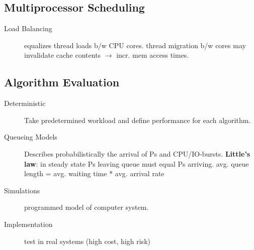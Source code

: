 \subsection*{Multiprocessor Scheduling} %
\begin{description}
    \item[Load Balancing]equalizes thread loads b/w CPU cores. thread migration b/w cores may invalidate cache contents $\rightarrow$ incr. mem access times.

\end{description}

\subsection*{Algorithm Evaluation}
\begin{description}
    \item[Deterministic]Take predetermined workload and define performance for each algorithm.
    \item[Queueing Models]Describes probabilistically the arrival of Ps and CPU/IO-bursts. \textbf{Little's law}: in steady state Ps leaving queue must equal Ps arriving. avg. queue length = avg. waiting time * avg. arrival rate
    \item[Simulations] programmed model of computer system.
    \item[Implementation]test in real systems (high cost, high risk)
\end{description}
